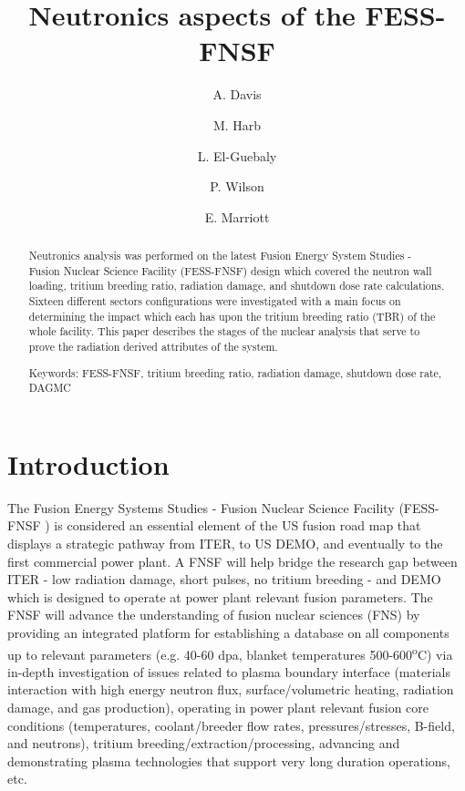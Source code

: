 \documentclass[12pt, letterpaper]{elsarticle}
\title{Neutronics aspects of the FESS-FNSF}
\author[wisc]{A. Davis\corref{cor1}}
\author[wisc]{M. Harb}
\author[wisc]{L. El-Guebaly}
\author[wisc]{P. Wilson}
\author[wisc]{E. Marriott}
\begin{document}
 
\begin{abstract}
Neutronics analysis was performed on the latest Fusion Energy System Studies - Fusion Nuclear Science Facility (FESS-FNSF) design which covered the neutron wall loading, tritium breeding ratio, radiation damage, and shutdown dose rate calculations. Sixteen different sectors configurations were investigated with a main focus on determining the impact which each has upon the tritium breeding ratio (TBR) of the whole facility. This paper describes the stages of the nuclear analysis that serve to prove the radiation derived attributes of the system.

\vspace{5mm}
\noindent
Keywords: FESS-FNSF, tritium breeding ratio, radiation damage, shutdown dose rate, DAGMC
\end{abstract}

\begin{titlepage}
\maketitle
\end{titlepage}

\newpage
\listoffigures

\newpage
\section{Introduction} \label{Introduction}
The Fusion Energy Systems Studies - Fusion Nuclear Science Facility (FESS-FNSF \cite{ref_1}) is considered an essential element of the US fusion road map that displays a strategic pathway from ITER, to US DEMO, and eventually to the first commercial power plant. A FNSF will help bridge the research gap between ITER - low radiation damage, short pulses, no tritium breeding - and DEMO which is designed to operate at power plant relevant fusion parameters. The FNSF will advance the understanding of fusion nuclear sciences (FNS) by providing an integrated platform for establishing a database on all components up to relevant parameters (e.g. 40-60 dpa, blanket temperatures 500-600\textsuperscript{o}C) via in-depth investigation of issues related to plasma boundary interface (materials interaction with high energy neutron flux, surface/volumetric heating, radiation damage, and gas production), operating in power plant relevant fusion core conditions (temperatures, coolant/breeder flow rates, pressures/stresses, B-field, and neutrons), tritium breeding/extraction/processing, advancing and demonstrating plasma technologies that support very long duration operations, etc.\vspace{5mm}
\end{document}

